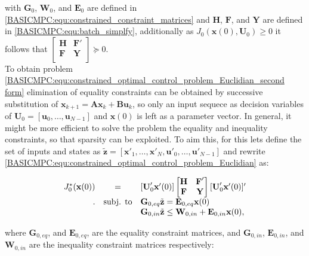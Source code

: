     with $\textbf{G}_0$, $\textbf{W}_0$, and $\textbf{E}_0$ are defined in \ref{BASICMPC:equ:constrained_constraint_matrices} and $\textbf{H}$, $\textbf{F}$, and $\textbf{Y}$ are defined in \ref{BASICMPC:equ:batch_simplfy}, additionally as $J_0(\textbf{x}(0),\textbf{U}_0)\geq 0$ it follows that $\begin{bmatrix}
            \textbf{H}&\textbf{F}'\\
            \textbf{F}&\textbf{Y}\\
            \end{bmatrix}\succeq 0$.\\
    To obtain problem \ref{BASICMPC:equ:constrained_optimal_control_problem_Euclidian_second form} elimination of equality constraints can be obtained by successive substitution of $\textbf{x}_{k+1}=\textbf{Ax}_{k}+\textbf{Bu}_{k}$, so only an input sequece as decision variables of $\textbf{U}_0=[\textbf{u}_0,\dots,\textbf{u}_{N-1}]$ and $\textbf{x}(0)$ is left as a parameter vector. In general, it might be more efficient to solve the problem the equality and inequality constraints, so that sparsity can be exploited. To aim this, for this lets define the set of inputs and states as $\tilde{\textbf{z}}=[\textbf{x}'_1,\dots,\textbf{x}'_N,\textbf{u}'_0,\dots,\textbf{u}'_{N-1}]$ and rewrite \ref{BASICMPC:equ:constrained_optimal_control_problem_Euclidian} as:
    
    \begin{equation}
    \begin{array}{rcl}
            J^*_0(\textbf{x}(0))
            &=&[\textbf{U}'_0\textbf{x}'(0)]
            \begin{bmatrix}
            \textbf{H}&\textbf{F}'\\
            \textbf{F}&\textbf{Y}\\
            \end{bmatrix}
            [\textbf{U}'_0\textbf{x}'(0)]'\\.
            &\textnormal{subj. to}&\textbf{G}_{0,eq}\tilde{\textbf{z}}=\textbf{E}_{0,eq}\textbf{x}(0)\\
            &&\textbf{G}_{0,in}\tilde{\textbf{z}}\leq\textbf{W}_{0,in}+\textbf{E}_{0,in}\textbf{x}(0),
        \end{array}
        \label{BASICMPC:equ:constrained_Euclidian_mergedconstraint}
    \end{equation}
    
    where $\textbf{G}_{0,eq}$, and $\textbf{E}_{0,eq}$, are the equality constraint matrices, and  $\textbf{G}_{0,in}$, $\textbf{E}_{0,in}$, and $\textbf{W}_{0,in}$ are the inequality constraint matrices respectively:
    
